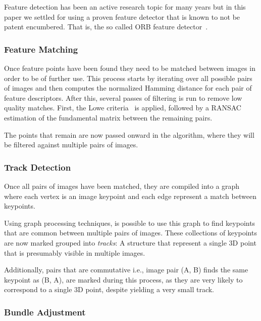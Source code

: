 \documentclass[acmtog]{acmart}
\begin{document}
Feature detection has been an active research topic for many years but in this
paper we settled for using a proven feature detector that is known to not be
patent encumbered. That is, the so called ORB feature detector~\cite{orb2011}.


\subsubsection{Feature Matching}

Once feature points have been found they need to be matched between images in
order to be of further use. This process starts by iterating over all possible
pairs of images and then computes the normalized Hamming distance for each pair
of feature descriptors. After this, several passes of filtering is run to remove
low quality matches. First, the Lowe criteria~\cite{sift2004} is applied,
followed by a RANSAC~\cite{} estimation of the fundamental matrix between the
remaining pairs.



The points that remain are now passed onward in the algorithm, where they will
be filtered against multiple pairs of images.


\subsubsection{Track Detection}

Once all pairs of images have been matched, they are compiled into a graph where
each vertex is an image keypoint and each edge represent a match between
keypoints.


Using graph processing techniques, is possible to use this graph to find
keypoints that are common between multiple pairs of images. These collections of
keypoints are now marked grouped into \emph{tracks}: A structure that represent
a single 3D point that is presumably visible in multiple images.

Additionally, pairs that are commutative i.e., image pair (A, B) finds the same
keypoint as (B, A), are marked during this process, as they are very likely to
correspond to a single 3D point, despite yielding a very small track.


\subsubsection{Bundle Adjustment}
\end{document}
